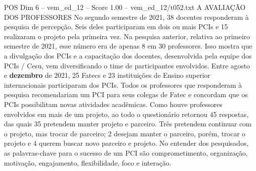\begin{textsample}{POS Dim 6 – vem\_ed\_12 – Score 1.00 – vem\_ed\_12/t052.txt}  \label{ex:f6_pos_018}
A AVALIAÇÃO DOS PROFESSORES No segundo semestre de 2021, 38 docentes responderam à pesquisa de percepção.
Seis deles participaram em dois ou mais PCIs e 15 realizaram o projeto pela primeira vez.
Na pesquisa anterior, relativa ao primeiro semestre de 2021, esse número era de apenas 8 em 30 professores.
Isso mostra que a divulgação dos PCIs e a capacitação dos docentes, desenvolvida pela equipe dos PCIs / Cesu, vem diversificando o time de participantes envolvidos.
Entre agosto e \textbf{dezembro} de 2021, 25 Fatecs e 23 instituições de Ensino superior internacionais participaram dos PCIs.
Todos os professores que responderam à pesquisa recomendariam um PCI para seus colegas de Fatec e concordam que os PCIs possibilitam novas atividades acadêmicas.
Como houve professores envolvidos em mais de um projeto, ao todo o questionário retornou 45 respostas, das quais 35 pretendem manter projeto e parceiro.
Três pretendem continuar com o projeto, mas trocar de parceiro; 2 desejam manter o parceiro, porém, trocar o projeto e 4 querem buscar novo parceiro e projeto.
No entender dos pesquisados, as palavras-chave para o sucesso de um PCI são comprometimento, organização, motivação, engajamento, flexibilidade, foco e interação.

\end{textsample}
